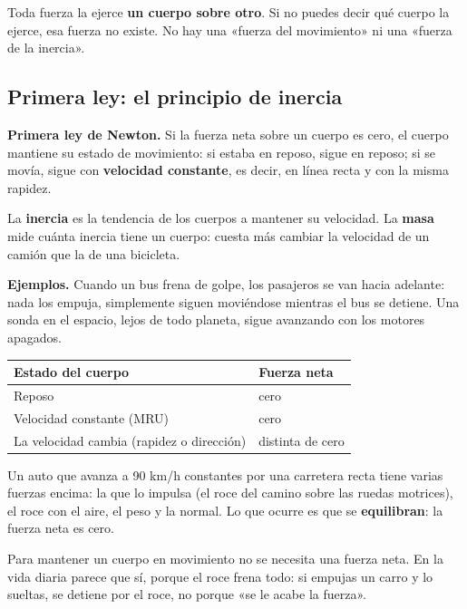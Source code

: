 \begin{clave}[{Recuerda}] Toda fuerza la ejerce \textbf{un cuerpo sobre otro}. Si no puedes decir qué cuerpo la ejerce, esa fuerza no existe. No hay una «fuerza del movimiento» ni una «fuerza de la inercia».\end{clave}
\subsection{Primera ley: el principio de inercia}
\textbf{Primera ley de Newton.} Si la fuerza neta sobre un cuerpo es cero, el cuerpo mantiene su estado de movimiento: si estaba en reposo, sigue en reposo; si se movía, sigue con \textbf{velocidad constante}, es decir, en línea recta y con la misma rapidez.

 

La \textbf{inercia} es la tendencia de los cuerpos a mantener su velocidad. La \textbf{masa} mide cuánta inercia tiene un cuerpo: cuesta más cambiar la velocidad de un camión que la de una bicicleta.

 

\textbf{Ejemplos.} Cuando un bus frena de golpe, los pasajeros se van hacia adelante: nada los empuja, simplemente siguen moviéndose mientras el bus se detiene. Una sonda en el espacio, lejos de todo planeta, sigue avanzando con los motores apagados.

 
\begin{center}\small
\begin{tabular}{@{}ll@{}}
\toprule
\textbf{Estado del cuerpo} & \textbf{Fuerza neta} \\
\midrule
Reposo & cero \\
Velocidad constante (MRU) & cero \\
La velocidad cambia (rapidez o dirección) & distinta de cero \\
\bottomrule
\end{tabular}
\end{center}
  
\begin{clave} Un auto que avanza a 90 km/h constantes por una carretera recta tiene varias fuerzas encima: la que lo impulsa (el roce del camino sobre las ruedas motrices), el roce con el aire, el peso y la normal. Lo que ocurre es que se \textbf{equilibran}: la fuerza neta es cero.\end{clave}
 
\begin{clave}[{Recuerda}] Para mantener un cuerpo en movimiento no se necesita una fuerza neta. En la vida diaria parece que sí, porque el roce frena todo: si empujas un carro y lo sueltas, se detiene por el roce, no porque «se le acabe la fuerza».\end{clave}
